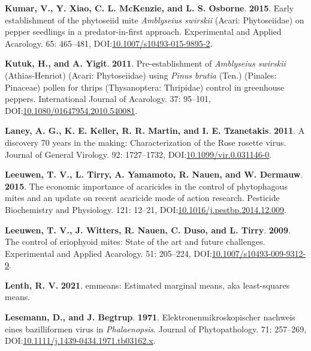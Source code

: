 \documentclass[12pt,final,CPage]{ufthesis}
\newlength{\cslhangindent}
\newenvironment{CSLReferences}[2] %
{%
	\setlength{\parindent}{0pt}
	\ifodd #1 \everypar{\setlength{\hangindent}{\cslhangindent}}\ignorespaces\fi
	\ifnum #2 > 0
	\setlength{\parskip}{#2\baselineskip}
	\fi
}%
{}
\begin{document}
{\begin{CSLReferences}{1}{0}
  \leavevmode{}%
  \textbf{Kumar, V., Y. Xiao, C. L. McKenzie, and L. S. Osborne}. \textbf{2015}. Early establishment of the phytoseiid mite {\emph{Amblyseius swirskii}} ({Acari}: {Phytoseiidae}) on pepper seedlings in a predator-in-first approach. Experimental and Applied Acarology. 65: 465--481, DOI:\href{https://doi.org/10.1007/s10493-015-9895-2}{10.1007/s10493-015-9895-2}.

  \leavevmode{}%
  \textbf{Kutuk, H., and A. Yigit}. \textbf{2011}. Pre-establishment of {\emph{Amblyseius swirskii}} {(Athias-Henriot)} {({Acari}: {Phytoseiidae})} using {\emph{Pinus brutia}} {(Ten.)} {(Pinales: Pinaceae)} pollen for thrips {(Thysanoptera: Thripidae)} control in greenhouse peppers. International Journal of Acarology. 37: 95--101, DOI:\href{https://doi.org/10.1080/01647954.2010.540081}{10.1080/01647954.2010.540081}.

  \leavevmode{}%
  \textbf{Laney, A. G., K. E. Keller, R. R. Martin, and I. E. Tzanetakis}. \textbf{2011}. A discovery 70 years in the making: Characterization of the {Rose rosette virus}. Journal of General Virology. 92: 1727--1732, DOI:\href{https://doi.org/10.1099/vir.0.031146-0}{10.1099/vir.0.031146-0}.

  \leavevmode{}%
  \textbf{Leeuwen, T. V., L. Tirry, A. Yamamoto, R. Nauen, and W. Dermauw}. \textbf{2015}. The economic importance of acaricides in the control of phytophagous mites and an update on recent acaricide mode of action research. Pesticide Biochemistry and Physiology. 121: 12--21, DOI:\href{https://doi.org/10.1016/j.pestbp.2014.12.009}{10.1016/j.pestbp.2014.12.009}.

  \leavevmode{}%
  \textbf{Leeuwen, T. V., J. Witters, R. Nauen, C. Duso, and L. Tirry}. \textbf{2009}. The control of eriophyoid mites: State of the art and future challenges. Experimental and Applied Acarology. 51: 205--224, DOI:\href{https://doi.org/10.1007/s10493-009-9312-9}{10.1007/s10493-009-9312-9}.

  \leavevmode{}%
  \textbf{Lenth, R. V.} \textbf{2021}. {emmeans}: Estimated marginal means, aka least-squares means.

  \leavevmode{}%
  \textbf{Lesemann, D., and J. Begtrup}. \textbf{1971}. Elektronenmikroskopischer nachweis eines bazilliformen virus in {\emph{Phalaenopsis}}. Journal of Phytopathology. 71: 257--269, DOI:\href{https://doi.org/10.1111/j.1439-0434.1971.tb03162.x}{10.1111/j.1439-0434.1971.tb03162.x}.


\end{CSLReferences}}
\end{document}
